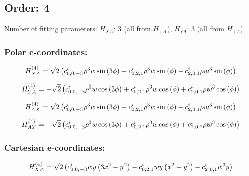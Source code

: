 \documentclass[fleqn]{article}
\begin{document}
\subsection{Order: 4}
Number of fitting parameters: $H_{XA}$: $3$ (all from $H_{+A}$), $H_{YA}$: $3$ (all from $H_{+A}$).
\subsubsection*{Polar e-coordinates:}

\begin{dmath*}
H_{XA}^{(4)}=\sqrt{2} \left(c^{i}_{0,0,-3} \rho^{3} w \sin{\left (3 \phi \right )} - c^{i}_{0,2,1} \rho^{3} w \sin{\left (\phi \right )} - c^{i}_{2,0,1} \rho w^{3} \sin{\left (\phi \right )}\right)\\
\end{dmath*}

\begin{dmath*}
H_{YA}^{(4)}=-  \sqrt{2} \left( c^{i}_{0,0,-3} \rho^{3} w \cos{\left (3 \phi \right )} +  c^{i}_{0,2,1} \rho^{3} w \cos{\left (\phi \right )} +  c^{i}_{2,0,1} \rho w^{3} \cos{\left (\phi \right )}\right)\\
\end{dmath*}

\begin{dmath*}
H_{AX}^{(4)}=\sqrt{2} \left(c^{i}_{0,0,-3} \rho^{3} w \sin{\left (3 \phi \right )} - c^{i}_{0,2,1} \rho^{3} w \sin{\left (\phi \right )} - c^{i}_{2,0,1} \rho w^{3} \sin{\left (\phi \right )}\right)\\
\end{dmath*}

\begin{dmath*}
H_{AY}^{(4)}=-  \sqrt{2} \left( c^{i}_{0,0,-3} \rho^{3} w \cos{\left (3 \phi \right )} +  c^{i}_{0,2,1} \rho^{3} w \cos{\left (\phi \right )} +  c^{i}_{2,0,1} \rho w^{3} \cos{\left (\phi \right )}\right)\\
\end{dmath*}
\subsubsection*{Cartesian e-coordinates:}

\begin{dmath*}
H_{XA}^{(4)}=\sqrt{2} \left(c^{i}_{0,0,-3} w y \left(3 x^{2} - y^{2}\right) - c^{i}_{0,2,1} w y \left(x^{2} + y^{2}\right) - c^{i}_{2,0,1} w^{3} y\right)\\
\end{dmath*}
\end{document}
